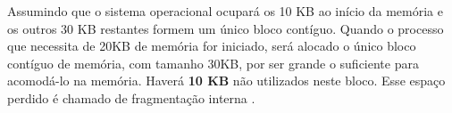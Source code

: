 
Assumindo que o sistema operacional ocupará os 10 KB ao início da memória e os
outros 30 KB restantes formem um único bloco contíguo.
Quando o processo que necessita de 20KB de memória for iniciado,  será alocado
o único bloco contíguo de memória, com tamanho 30KB, por ser grande o 
suficiente para acomodá-lo na memória.  Haverá \textbf{10 KB} não utilizados
neste bloco.  Esse espaço perdido é chamado de fragmentação interna 
\cite{ContiguousTechniques}.

